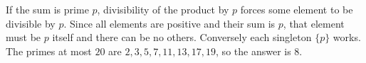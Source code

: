 If the sum is prime $p$, divisibility of the product by $p$ forces some element to be divisible by $p$. Since all elements are positive and their sum is $p$, that element must be $p$ itself and there can be no others. Conversely each singleton $\{p\}$ works. The primes at most $20$ are $2,3,5,7,11,13,17,19$, so the answer is $\boxed8$.
